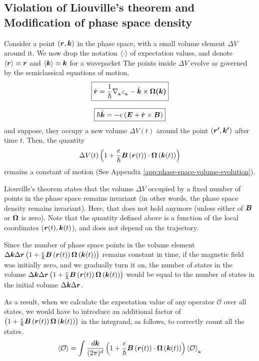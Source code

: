 \documentclass{revtex4-2}
\renewcommand\vec[1]{\ensuremath\boldsymbol{#1}} %
\begin{document}
\subsection{Violation of Liouville's theorem and Modification of phase space density}
Consider a point $\left(\vec{r},\vec{k}\right)$ in the phase space, with a small volume element $\Delta V$ around it. We now drop the notation $\expval{\cdot}$ of expectation values, and denote $\expval{\vec{r}} \equiv \vec{r}$ and $\expval{\vec{k}} \equiv \vec{k}$ for a wavepacket The points inside $\Delta V$ evolve as governed by the semiclassical equations of motion,
\begin{equation}\label{Eq:evolution-of-R}
	\boxed{\dot{\vec{r}} = \frac{1}{\hbar} \nabla{_{_{\vec{k}}}} \varepsilon_{_{\vec{k}}} - \dot{\vec{k}} \times \vec{\Omega(\vec{k})}}
\end{equation}

\begin{equation}\label{Eq:evolution-of-K}
	\boxed{\hbar \dot{\vec{k}} = -e\left(\vec{E} + \dot{\vec{r}} \times \vec{B} \right)}
\end{equation}
and suppose, they occupy a new volume $\Delta V(t)$ around the point $\left(\vec{r'},\vec{k'}\right)$ after time $t$. Then, the quantity $$\Delta V(t) \left(1 + \frac{e}{\hbar} \vec{B}\left(\vec{r}(t)\right) \cdot  \vec{\Omega}\left(\vec{k}(t)\right)\right)$$ remains a constant of motion (See Appendix \ref{app:phase-space-volume-evolution}).

Liouville's theorem states that the volume $\Delta V$ occupied by a fixed number of points in the phase space remains invariant (in other words, the phase space density remains invariant). Here, that does not hold anymore (unless either of $\vec{B}$ or $\vec{\Omega}$ is zero). Note that the quantity defined above is a function of the local coordinates ($\vec{r}(t), \vec{k}(t)$), and does not depend on the trajectory.

Since the number of phase space points in the volume element $\Delta \vec{k} \Delta \vec{r} \left(1 + \frac{e}{\hbar} \vec{B}\left(\vec{r}(t)\right) \vec{\Omega}\left(\vec{k}(t)\right)\right)$ remains constant in time, if the magnetic field was initially zero, and we gradually turn it on, the number of states in the volume $\Delta \vec{k} \Delta \vec{r} \left(1 + \frac{e}{\hbar} \vec{B}\left(\vec{r}(t)\right) \vec{\Omega}\left(\vec{k}(t)\right)\right)$ would be equal to the number of states in the initial volume $\Delta \vec{k} \Delta \vec{r}$.

As a result, when we calculate the expectation value of any operator $\mathcal{O}$ over all states, we would have to introduce an additional factor of $\left(1 + \frac{e}{\hbar} \vec{B}\left(\vec{r}(t)\right) \vec{\Omega}\left(\vec{k}(t)\right)\right)$ in the integrand, as follows, to correctly count all the states.
$$\expval{\mathcal{O}} = \int \frac{d\vec{k}}{(2\pi)^d} \left(1 + \frac{e}{\hbar} \vec{B}\left(\vec{r}(t)\right) \cdot  \vec{\Omega}\left(\vec{k}(t)\right)\right) \expval{\mathcal{O}}_{_{\vec{k}}}$$
\end{document}
